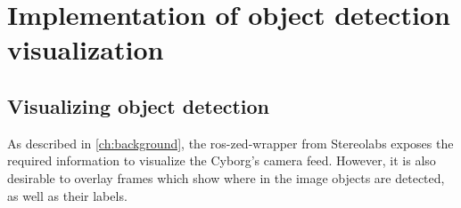 \documentclass[\rootfolder/main.tex]{subfiles}
\begin{document}
\chapter{Implementation of object detection visualization} %

\label{ch:foo} %

\section{Visualizing object detection}

As described in \cref{ch:background}, the ros-zed-wrapper from Stereolabs exposes the required information to visualize the Cyborg's camera feed.
However, it is also desirable to overlay frames which show where in the image objects are detected, as well as their labels.
\end{document}

